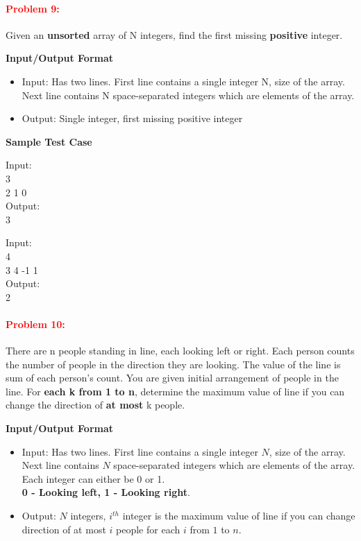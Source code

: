 \documentclass[a4paper,11pt]{article} %
\begin{document}
\newpage
\paragraph{\textcolor{red}{Problem 9:}}
Given an \textbf{unsorted} array of N integers, find the first missing \textbf{positive} integer.

\textbf{Input/Output Format}
\begin{itemize}
    \item  Input: Has two lines. First line contains a single integer N, size of the array. Next line contains N space-separated integers which are elements of the array.
    \item  Output: Single integer, first missing positive integer
\end{itemize}

\textbf{Sample Test Case}

Input:\\
3\\
2 1 0\\
Output: \\
3
\vspace*{0.5cm}

Input:\\
4\\
3 4 -1 1\\
Output: \\
2
\vspace*{0.5cm}

\paragraph{\textcolor{red}{Problem 10:}}
There are n people standing in line, each looking left or right. Each person counts the number of people in the direction they are looking. The value of the line is sum of each person's count. You are given initial arrangement of people in the line. For \textbf{each k from 1 to n}, determine the maximum value of line if you can change the direction of \textbf{at most} k people.

\textbf{Input/Output Format}
\begin{itemize}
    \item  Input: Has two lines. First line contains a single integer $N$, size of the array. Next line contains $N$ space-separated integers which are elements of the array. Each integer can either be 0 or 1.\\ \textbf{0 - Looking left, 1 - Looking right}.
    \item  Output: $N$ integers, $i^{th}$ integer is the maximum value of line if you can change direction of at most $i$ people for each $i$ from $1$ to $n$.
\end{itemize}
\end{document}
